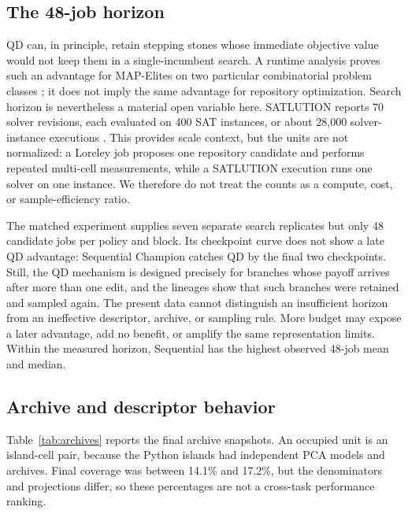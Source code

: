 \documentclass[10pt,twocolumn]{article}
\begin{document}
\subsection{The 48-job horizon}

QD can, in principle, retain stepping stones whose immediate objective value
would not keep them in a single-incumbent search. A runtime analysis proves
such an advantage for MAP-Elites on two particular combinatorial problem
classes \citep{qian2024qdhelpful}; it does not imply the same advantage for
repository optimization. Search horizon is nevertheless a material open
variable here. SATLUTION reports 70 solver revisions, each evaluated on 400 SAT
instances, or about 28,000 solver-instance executions
\citep{yu2025satlution}. This provides scale context, but the units are not
normalized: a Loreley job proposes one repository candidate and performs
repeated multi-cell measurements, while a SATLUTION execution runs one solver
on one instance. We therefore do not treat the counts as a compute, cost, or
sample-efficiency ratio.

The matched experiment supplies seven separate search replicates but only 48 candidate jobs
per policy and block. Its checkpoint curve does not show a late QD advantage:
Sequential Champion catches QD by the final two checkpoints. Still, the QD
mechanism is designed precisely for branches whose payoff arrives after more
than one edit, and the lineages show that such branches were retained and
sampled again. The
present data cannot distinguish an insufficient horizon from an ineffective
descriptor, archive, or sampling rule. More budget may expose a later
advantage, add no benefit, or amplify the same representation limits. Within
the measured horizon, Sequential has the highest observed 48-job mean and
median.

\subsection{Archive and descriptor behavior}

Table~\ref{tab:archives} reports the final archive snapshots. An occupied unit
is an island-cell pair, because the Python islands had independent PCA models
and archives. Final coverage was between 14.1\% and 17.2\%, but the denominators
and projections differ, so these percentages are not a cross-task performance
ranking.
\end{document}
